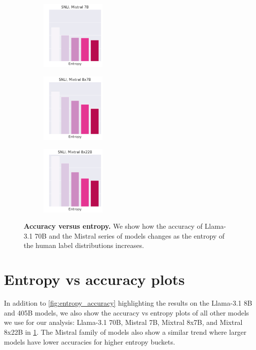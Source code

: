 \begin{figure}[t]
\begin{subfigure}[b]{0.22\textwidth}
    \end{subfigure}
    \begin{subfigure}[b]{0.22\textwidth}
        \includegraphics[height=3.4cm]{figures/appendix/entropy_acc_snli_7B}
    \end{subfigure}
    \begin{subfigure}[b]{0.22\textwidth}
        \includegraphics[height=3.4cm]{figures/appendix/entropy_acc_snli_8x7B}
    \end{subfigure}
    \begin{subfigure}[b]{0.22\textwidth}
        \includegraphics[height=3.4cm]{figures/appendix/entropy_acc_snli_8x22B}
    \end{subfigure}
    \caption{\textbf{Accuracy versus entropy.} We show how the accuracy of Llama-3.1 70B and the Mistral series of models changes as the entropy of the human label distributions increases.}
    \label{fig:entropy_accuracy_all}
\end{figure}

\section{Entropy vs accuracy plots}\label{app:entropy_vs_accuracy}

In addition to \cref{fig:entropy_accuracy} highlighting the results on the Llama-3.1 8B and 405B models, we also show the accuracy vs entropy plots of all other models we use for our analysis: Llama-3.1 70B, Mistral 7B, Mixtral 8x7B, and Mixtral 8x22B in \cref{fig:entropy_accuracy_all}. The Mistral family of models also show a similar trend where larger models have lower accuracies for higher entropy buckets.

